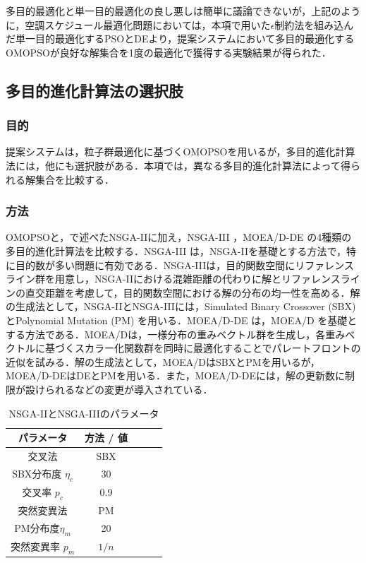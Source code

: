 多目的最適化と単一目的最適化の良し悪しは簡単に議論できないが，上記のように，空調スケジュール最適化問題においては，本項で用いた$\epsilon$制約法を組み込んだ単一目的最適化するPSOとDEより，提案システムにおいて多目的最適化するOMOPSOが良好な解集合を1度の最適化で獲得する実験結果が得られた．

\subsection{多目的進化計算法の選択肢}\label{subsec::sim_algo}
\subsubsection{目的}
提案システムは，粒子群最適化に基づくOMOPSOを用いるが，多目的進化計算法には，他にも選択肢がある．本項では，異なる多目的進化計算法によって得られる解集合を比較する．

\subsubsection{方法}
OMOPSOと，で述べたNSGA-IIに加え，NSGA-III \cite{Deb14}，MOEA/D-DE \cite{Li09}の4種類の多目的進化計算法を比較する．NSGA-III \cite{Deb14}は，NSGA-IIを基礎とする方法で，特に目的数が多い問題に有効である．NSGA-IIIは，目的関数空間にリファレンスライン群を用意し，NSGA-IIにおける混雑距離の代わりに解とリファレンスラインの直交距離を考慮して，目的関数空間における解の分布の均一性を高める．解の生成法として，NSGA-IIとNSGA-IIIには，Simulated Binary Crossover (SBX) \cite{Agrawal95}とPolynomial Mutation (PM) \cite{Deb96}を用いる．MOEA/D-DE \cite{Li09}は，MOEA/D \cite{Zhang07}を基礎とする方法である．MOEA/Dは，一様分布の重みベクトル群を生成し，各重みベクトルに基づくスカラー化関数群を同時に最適化することでパレートフロントの近似を試みる．解の生成法として，MOEA/DはSBXとPMを用いるが，MOEA/D-DEはDEとPMを用いる．また，MOEA/D-DEには，解の更新数に制限が設けられるなどの変更が導入されている．

\begin{table}[t]
  \begin{center}
    \caption{NSGA-IIとNSGA-IIIのパラメータ}
    \label{tab::sim_param_nsga}
    \small
    \begin{tabular}{c|cccc}
      \hline
      パラメータ           & 方法 / 値            \\
      \hline \hline
      交叉法               & SBX \cite{Agrawal95} \\
      SBX分布度 $\eta_{c}$ & 30                   \\
      交叉率 $p_{c}$       & 0.9                  \\
      突然変異法           & PM \cite{Deb96}      \\
      PM分布度$ \eta_{m}$  & 20                   \\
      突然変異率 $p_{m}$   & $1/n$                \\
      \hline
    \end{tabular}
  \end{center}
\end{table}

